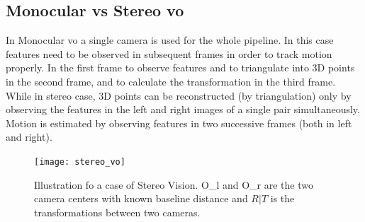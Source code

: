 \subsection{Monocular vs Stereo \acrshort{vo} }
In Monocular \acrshort{vo} a single camera is used for the whole pipeline. In this case features need to be observed in subsequent frames in order to track motion properly. In the first frame to observe features and to triangulate into 3D points in the second frame, and to calculate the transformation in the third frame\cite{KhalidYousif-et-al-2015}. While in stereo case, 3D points can be reconstructed (by triangulation) only by observing the features in the left and right images of a single pair simultaneously. Motion is estimated by observing features in two successive frames (both in left and right). 


 \begin{figure}[h]
 	\centering
 	\texttt{[image: stereo\_vo]}
 	\caption{Illustration fo a case of Stereo Vision. O_{l} and O_{r} are the two camera centers with known baseline distance and $R|T$ is the transformations between two cameras.}
 	\label{fig:stereo_vo}
 \end{figure}

